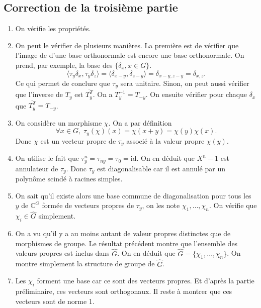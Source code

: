 \documentclass{article}[a4paper]
\newcommand{\C}{\mathbb{C}}
\newcommand{\braket}[2]{\langle #1,#2\rangle}
\begin{document}
\subsection*{Correction de la troisième partie}
\begin{enumerate}
    \item On vérifie les propriétés.
    \item On peut le vérifier de plusieurs manières. La première est de vérifier que l'image de 
    d'une base orthonormale est encore une base orthonormale. On prend, par exemple, la base des 
    \(\{\delta_x,x\in G\}\). 
    \begin{equation*}
        \braket{\tau_y\delta_x}{\tau_y\delta_z} = \braket{\delta_{x-y}}{\delta_{z-y}} = \delta_{x-y,z-y} = \delta_{x,z}.
    \end{equation*}
    Ce qui permet de conclure que \(\tau_y\) sera unitaire. Sinon, on peut aussi vérifier que l'inverse 
    de \(T_y\) est \(\overline{T_y^T}\). On a \(T_y^{-1} = T_{-y}\). On ensuite vérifier 
    pour chaque \(\delta_x\) que \(\overline{T_y^T} = T_{-y}\).
    \item On considère un morphisme \(\chi\). On a par définition 
    \begin{equation*}
        \forall x\in G, \;\tau_y(\chi)(x) = \chi(x+y) = \chi(y)\chi(x).
    \end{equation*}
    Donc \(\chi\) est un vecteur propre de \(\tau_y\) associé à la valeur propre \(\chi(y)\).
    \item On utilise le fait que \(\tau_y^n = \tau_{ny} = \tau_{0} = \mathrm{id}\). On en 
    déduit que \(X^n -1\) est annulateur de \(\tau_y\). Donc \(\tau_y\) est diagonalisable car 
    il est annulé par un polynôme scindé à racines simples.
    \item On sait qu'il existe alors une base commune de diagonalisation pour tous les \(y\) de \(\C^G\) formée de vecteurs propres de \(\tau_y\), on les note 
    \(\chi_1,\dots,\chi_n\). On vérifie que \(\chi_i\in \widehat{G}\) simplement. 
    \item On a vu qu'il y a au moins autant de valeur propres distinctes que de morphismes de groupe.
    Le résultat précédent montre que l'ensemble des valeurs propres est inclus dans \(\widehat{G}\).
    On en déduit que \(\widehat{G} = \{\chi_1,\dots,\chi_n\}\). On montre simplement la structure de groupe de \(\widehat{G}\).
    \item Les \(\chi_i\) forment une base car ce sont des vecteurs propres. Et d'après la partie préliminaire, 
    ces vecteurs sont orthogonaux. Il reste à montrer que ces vecteurs sont de norme 1.

\end{enumerate}
\end{document}
